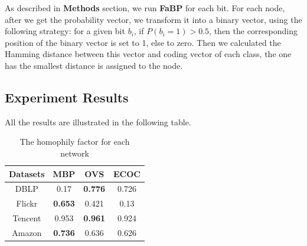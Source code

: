 As described in \textbf{Methods} section, we run \textbf{FaBP} for each bit. For each node, after we get the probability vector, we transform it into a binary vector, using the following strategy: for a given bit $b_i$, if $P(b_i=1) > 0.5$, then the corresponding position of the binary vector is set to 1, else to zero. Then we calculated the Hamming distance between this vector and coding vector of each class, the one has the smallest distance is assigned to the node. 

\subsection{Experiment Results}
All the results are illustrated in the following table.
\begin{table}[!ht]
\centering
\begin{tabular}{c|ccc}
\toprule
\textbf{Datasets} & \textbf{MBP} & \textbf{OVS} & \textbf{ECOC}\\
\midrule
DBLP &0.17 &\textbf{0.776} &0.726\\
Flickr & \textbf{0.653} & 0.421 & 0.13\\
Tencent & 0.953 & \textbf{0.961} & 0.924\\
Amazon & \textbf{0.736} & 0.636 & 0.626\\
\bottomrule
\end{tabular}
\caption{The homophily factor for each network}
\end{table} 











